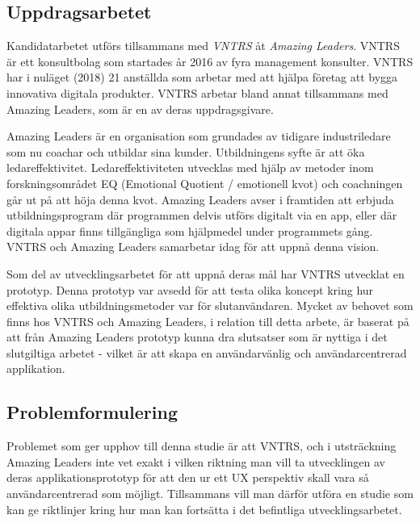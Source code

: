 \subsection{Uppdragsarbetet}
Kandidatarbetet utförs tillsammans med \textit{VNTRS} \cite{VNTRSVNTRSAB} åt \textit{Amazing Leaders}\cite{AmazingOrganisationsutveckling}. VNTRS är ett konsultbolag som startades år 2016 av fyra management konsulter. VNTRS har i nuläget (2018) 21 anställda som arbetar med att hjälpa företag att bygga innovativa digitala produkter. VNTRS arbetar bland annat tillsammans med Amazing Leaders, som är en av deras uppdragsgivare.
\newline
\parindent
\parskip

Amazing Leaders är en organisation som grundades av tidigare industriledare som nu coachar och utbildar sina kunder. Utbildningens syfte är att öka ledareffektivitet. Ledareffektiviteten utvecklas med hjälp av metoder inom forskningsområdet EQ (Emotional Quotient / emotionell kvot) och coachningen går ut på att höja denna kvot. Amazing Leaders avser i framtiden att erbjuda utbildningsprogram där programmen delvis utförs digitalt via en app, eller där digitala appar finns tillgängliga som hjälpmedel under programmets gång. VNTRS och Amazing Leaders samarbetar idag för att uppnå denna vision. 
\newline
\parindent
\parskip

Som del av utvecklingsarbetet för att uppnå deras mål har VNTRS utvecklat en prototyp. Denna prototyp var avsedd för att testa olika koncept kring hur effektiva olika utbildningsmetoder var för slutanvändaren. Mycket av behovet som finns hos VNTRS och Amazing Leaders, i relation till detta arbete, är baserat på att från Amazing Leaders prototyp kunna dra slutsatser som är nyttiga i det slutgiltiga arbetet - vilket är att skapa en användarvänlig och användarcentrerad applikation.

\subsection{Problemformulering} 
Problemet som ger upphov till denna studie är att VNTRS, och i utsträckning Amazing Leaders inte vet exakt i vilken riktning man vill ta utvecklingen av deras applikationsprototyp för att den ur ett UX perspektiv skall vara så användarcentrerad som möjligt. Tillsammans vill man därför utföra en studie som kan  ge riktlinjer kring hur man kan fortsätta i det befintliga utvecklingsarbetet.
\newline 


